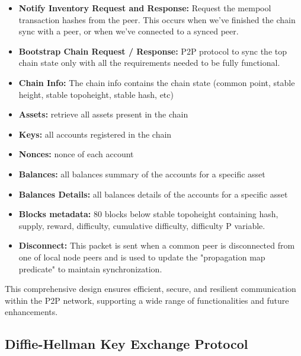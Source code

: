 \documentclass[10pt,a4paper,twocolumn]{article}
\begin{document}
\begin{itemize}
\item \textbf{Notify Inventory Request and Response:} Request the mempool transaction hashes from the peer. This occurs when we’ve finished the chain sync with a peer, or when we’ve connected to a synced peer.\\

\item \textbf{Bootstrap Chain Request / Response:} P2P protocol to sync the top chain state only with all the requirements needed to be fully functional.

\item \textbf{Chain Info:} The chain info contains the chain state (common point, stable height, stable topoheight, stable hash, etc)

\item \textbf {Assets:} retrieve all assets present in the chain

\item \textbf {Keys:} all accounts registered in the chain

\item \textbf {Nonces:} nonce of each account

\item \textbf {Balances:} all balances summary of the accounts for a specific asset

\item \textbf {Balances Details:} all balances details of the accounts for a specific asset

\item \textbf {Blocks metadata:} 80 blocks below stable topoheight containing hash, supply, reward, difficulty, cumulative difficulty, difficulty P variable.

\item \textbf{Disconnect:} This packet is sent when a common peer is disconnected from one of local node peers and is used to update the "propagation map predicate" to maintain synchronization.\\

\end{itemize}
This comprehensive design ensures efficient, secure, and resilient communication within the P2P network, supporting a wide range of functionalities and future enhancements.\\

\subsection{Diffie-Hellman Key Exchange Protocol}
\end{document}
